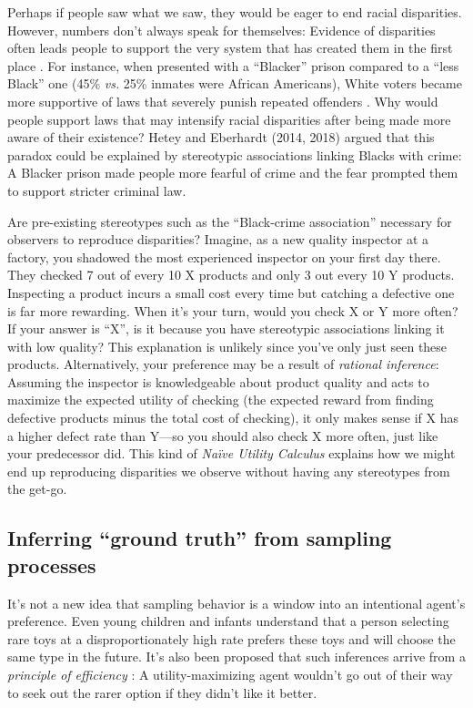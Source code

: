 \documentclass[10pt,letterpaper]{article}
\begin{document}
Perhaps if people saw what we saw, they would be eager to end racial disparities. However, numbers don't always speak for themselves: Evidence of disparities often leads people to support the very system that has created them in the first place \citep{hetey2018numbers}. For instance, when presented with a ``Blacker'' prison compared to a ``less Black'' one (45\% \emph{vs.} 25\% inmates were African Americans), White voters became more supportive of laws that severely punish repeated offenders \citep{hetey2014racial}. Why would people support laws that may intensify racial disparities after being made more aware of their existence? Hetey and Eberhardt (2014, 2018) argued that this paradox could be explained by stereotypic associations linking Blacks with crime: A Blacker prison made people more fearful of crime and the fear prompted them to support stricter criminal law. 

Are pre-existing stereotypes such as the ``Black-crime association'' necessary for observers to reproduce disparities? Imagine, as a new quality inspector at a factory, you shadowed the most experienced inspector on your first day there. They checked 7 out of every 10 X products and only 3 out every 10 Y products. Inspecting a product incurs a small cost every time but catching a defective one is far more rewarding. When it's your turn, would you check X or Y more often? If your answer is ``X'', is it because you have stereotypic associations linking it with low quality? This explanation is unlikely since you've only just seen these products. Alternatively, your preference may be a result of \emph{rational inference}: Assuming the inspector is knowledgeable about product quality and acts to maximize the expected utility of checking (the expected reward from finding defective products minus the total cost of checking), it only makes sense if X has a higher defect rate than Y---so you should also check X more often, just like your predecessor did. This kind of \emph{Na\"ive Utility Calculus} \citep*[NUC,][]{jara2016naive} explains how we might end up reproducing disparities we observe without having any stereotypes from the get-go.

\subsection{Inferring ``ground truth'' from sampling processes}
It's not a new idea that sampling behavior is a window into an intentional agent's preference. Even young children \citep*{kushnir2010young} and infants \citep*{wellman2016infants} understand that a person selecting rare toys at a disproportionately high rate prefers these toys and will choose the same type in the future. It's also been proposed that such inferences arrive from a \emph{principle of efficiency} \citep*{jara2018sensitivity}: A utility-maximizing agent wouldn't go out of their way to seek out the rarer option if they didn't like it better.
\end{document}
